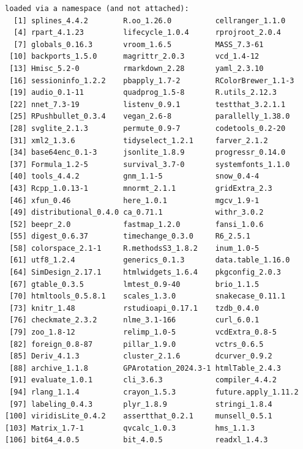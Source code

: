 \documentclass[
  letterpaper,
  DIV=11,
  numbers=noendperiod]{scrartcl}
\begin{document}
\begin{verbatim}
loaded via a namespace (and not attached):
  [1] splines_4.4.2        R.oo_1.26.0          cellranger_1.1.0    
  [4] rpart_4.1.23         lifecycle_1.0.4      rprojroot_2.0.4     
  [7] globals_0.16.3       vroom_1.6.5          MASS_7.3-61         
 [10] backports_1.5.0      magrittr_2.0.3       vcd_1.4-12          
 [13] Hmisc_5.2-0          rmarkdown_2.28       yaml_2.3.10         
 [16] sessioninfo_1.2.2    pbapply_1.7-2        RColorBrewer_1.1-3  
 [19] audio_0.1-11         quadprog_1.5-8       R.utils_2.12.3      
 [22] nnet_7.3-19          listenv_0.9.1        testthat_3.2.1.1    
 [25] RPushbullet_0.3.4    vegan_2.6-8          parallelly_1.38.0   
 [28] svglite_2.1.3        permute_0.9-7        codetools_0.2-20    
 [31] xml2_1.3.6           tidyselect_1.2.1     farver_2.1.2        
 [34] base64enc_0.1-3      jsonlite_1.8.9       progressr_0.14.0    
 [37] Formula_1.2-5        survival_3.7-0       systemfonts_1.1.0   
 [40] tools_4.4.2          gnm_1.1-5            snow_0.4-4          
 [43] Rcpp_1.0.13-1        mnormt_2.1.1         gridExtra_2.3       
 [46] xfun_0.46            here_1.0.1           mgcv_1.9-1          
 [49] distributional_0.4.0 ca_0.71.1            withr_3.0.2         
 [52] beepr_2.0            fastmap_1.2.0        fansi_1.0.6         
 [55] digest_0.6.37        timechange_0.3.0     R6_2.5.1            
 [58] colorspace_2.1-1     R.methodsS3_1.8.2    inum_1.0-5          
 [61] utf8_1.2.4           generics_0.1.3       data.table_1.16.0   
 [64] SimDesign_2.17.1     htmlwidgets_1.6.4    pkgconfig_2.0.3     
 [67] gtable_0.3.5         lmtest_0.9-40        brio_1.1.5          
 [70] htmltools_0.5.8.1    scales_1.3.0         snakecase_0.11.1    
 [73] knitr_1.48           rstudioapi_0.17.1    tzdb_0.4.0          
 [76] checkmate_2.3.2      nlme_3.1-166         curl_6.0.1          
 [79] zoo_1.8-12           relimp_1.0-5         vcdExtra_0.8-5      
 [82] foreign_0.8-87       pillar_1.9.0         vctrs_0.6.5         
 [85] Deriv_4.1.3          cluster_2.1.6        dcurver_0.9.2       
 [88] archive_1.1.8        GPArotation_2024.3-1 htmlTable_2.4.3     
 [91] evaluate_1.0.1       cli_3.6.3            compiler_4.4.2      
 [94] rlang_1.1.4          crayon_1.5.3         future.apply_1.11.2 
 [97] labeling_0.4.3       plyr_1.8.9           stringi_1.8.4       
[100] viridisLite_0.4.2    assertthat_0.2.1     munsell_0.5.1       
[103] Matrix_1.7-1         qvcalc_1.0.3         hms_1.1.3           
[106] bit64_4.0.5          bit_4.0.5            readxl_1.4.3        
\end{verbatim}
\end{document}
